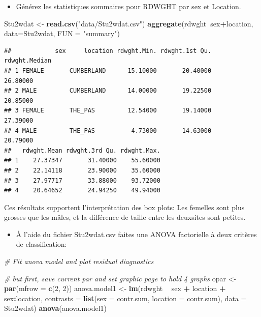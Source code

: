 \documentclass[12pt,]{book}
\newenvironment{Shaded}{\begin{snugshade}}{\end{snugshade}}
\newcommand{\CommentTok}[1]{\textcolor[rgb]{0.37,0.37,0.37}{\textit{#1}}}
\newcommand{\DataTypeTok}[1]{\textcolor[rgb]{0.27,0.27,0.27}{#1}}
\newcommand{\DecValTok}[1]{\textcolor[rgb]{0.06,0.06,0.06}{#1}}
\newcommand{\KeywordTok}[1]{\textcolor[rgb]{0.27,0.27,0.27}{\textbf{#1}}}
\newcommand{\NormalTok}[1]{#1}
\newcommand{\OperatorTok}[1]{\textcolor[rgb]{0.43,0.43,0.43}{\textbf{#1}}}
\newcommand{\StringTok}[1]{\textcolor[rgb]{0.5,0.5,0.5}{#1}}
\providecommand{\tightlist}{%
  \setlength{\itemsep}{0pt}\setlength{\parskip}{0pt}}
\begin{document}
\begin{itemize}
\tightlist
\item
  Générez les statistiques sommaires pour RDWGHT par sex et Location.
\end{itemize}

\begin{Shaded}
\begin{Highlighting}[]
\NormalTok{Stu2wdat <-}\StringTok{ }\KeywordTok{read.csv}\NormalTok{(}\StringTok{"data/Stu2wdat.csv"}\NormalTok{)}
\KeywordTok{aggregate}\NormalTok{(rdwght}\OperatorTok{~}\NormalTok{sex}\OperatorTok{+}\NormalTok{location, }\DataTypeTok{data=}\NormalTok{Stu2wdat, }\DataTypeTok{FUN =} \StringTok{"summary"}\NormalTok{)}
\end{Highlighting}
\end{Shaded}

\begin{verbatim}
##            sex     location rdwght.Min. rdwght.1st Qu. rdwght.Median
## 1 FEMALE       CUMBERLAND      15.10000       20.40000      26.80000
## 2 MALE         CUMBERLAND      14.00000       19.22500      20.85000
## 3 FEMALE       THE_PAS         12.54000       19.14000      27.39000
## 4 MALE         THE_PAS          4.73000       14.63000      20.79000
##   rdwght.Mean rdwght.3rd Qu. rdwght.Max.
## 1    27.37347       31.40000    55.60000
## 2    22.14118       23.90000    35.60000
## 3    27.97717       33.88000    93.72000
## 4    20.64652       24.94250    49.94000
\end{verbatim}

Ces résultats supportent l'interprétation des box plots: Les femelles sont plus grosses que les mâles, et la différence de taille entre les deuxsites sont petites.

\begin{itemize}
\tightlist
\item
  À l'aide du fichier Stu2wdat.csv faites une ANOVA factorielle à
  deux critères de classification:
\end{itemize}

\begin{Shaded}
\begin{Highlighting}[]
\CommentTok{# Fit anova model and plot residual diagnostics}


\CommentTok{# but first, save current par and set graphic page to hold 4 graphs}
\NormalTok{opar <-}\StringTok{ }\KeywordTok{par}\NormalTok{(}\DataTypeTok{mfrow =} \KeywordTok{c}\NormalTok{(}\DecValTok{2}\NormalTok{, }\DecValTok{2}\NormalTok{))}
\NormalTok{anova.model1 <-}\StringTok{ }\KeywordTok{lm}\NormalTok{(rdwght }\OperatorTok{~}\StringTok{ }\NormalTok{sex }\OperatorTok{+}\StringTok{ }\NormalTok{location }\OperatorTok{+}\StringTok{ }\NormalTok{sex}\OperatorTok{:}\NormalTok{location,}
\DataTypeTok{contrasts =} \KeywordTok{list}\NormalTok{(}\DataTypeTok{sex =}\NormalTok{ contr.sum, }\DataTypeTok{location =}\NormalTok{ contr.sum),}
\DataTypeTok{data =}\NormalTok{ Stu2wdat)}
\KeywordTok{anova}\NormalTok{(anova.model1)}
\end{Highlighting}
\end{Shaded}
\end{document}
